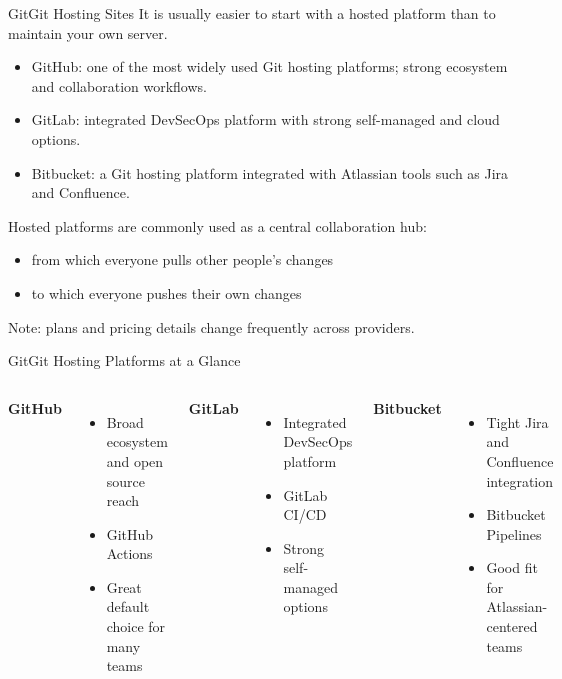 \documentclass[10pt,compress]{beamer}
\begin{document}
\begin{frame}{Git}{Git Hosting Sites}
It is usually easier to start with a hosted platform than to maintain your own server.

\begin{itemize}
 \item \alert{GitHub}: one of the most widely used Git hosting platforms; strong ecosystem and collaboration workflows.
 \item \alert{GitLab}: integrated DevSecOps platform with strong self-managed and cloud options.
    \item \alert{Bitbucket}: a Git hosting platform integrated with Atlassian tools such as Jira and Confluence.
\end{itemize}

Hosted platforms are commonly used as a central collaboration hub:
\begin{itemize}
 \item from which everyone pulls other people's changes
 \item to which everyone pushes their own changes
\end{itemize}

\tiny Note: plans and pricing details change frequently across providers.
\end{frame}

\begin{frame}{Git}{Git Hosting Platforms at a Glance}
\scriptsize
\begin{columns}[t]
\textbf{GitHub}
\begin{itemize}
\item Broad ecosystem and open source reach
\item GitHub Actions
\item Great default choice for many teams
\end{itemize}

\textbf{GitLab}
\begin{itemize}
\item Integrated DevSecOps platform
\item GitLab CI/CD
\item Strong self-managed options
\end{itemize}

\textbf{Bitbucket}
\begin{itemize}
\item Tight Jira and Confluence integration
\item Bitbucket Pipelines
\item Good fit for Atlassian-centered teams
\end{itemize}
\end{columns}
\end{frame}
\end{document}

